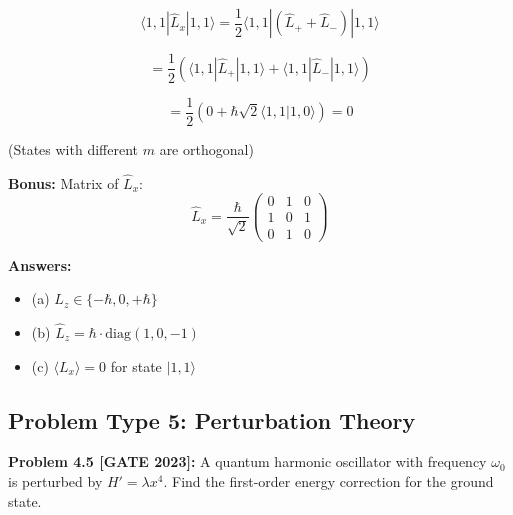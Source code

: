 \documentclass[12pt,a4paper]{article}
\begin{document}
\begin{solution}
$$\langle 1,1|\hat{L}_x|1,1\rangle = \frac{1}{2}\langle 1,1|(\hat{L}_+ + \hat{L}_-)|1,1\rangle$$

$$= \frac{1}{2}\left(\langle 1,1|\hat{L}_+|1,1\rangle + \langle 1,1|\hat{L}_-|1,1\rangle\right)$$

$$= \frac{1}{2}\left(0 + \hbar\sqrt{2}\langle 1,1|1,0\rangle\right) = 0$$

(States with different $m$ are orthogonal)

\textbf{Bonus:} Matrix of $\hat{L}_x$:
$$\hat{L}_x = \frac{\hbar}{\sqrt{2}}\begin{pmatrix}
0 & 1 & 0 \\
1 & 0 & 1 \\
0 & 1 & 0
\end{pmatrix}$$

\textbf{Answers:}
\begin{itemize}
    \item (a) $L_z \in \{-\hbar, 0, +\hbar\}$
    \item (b) $\hat{L}_z = \hbar \cdot \text{diag}(1, 0, -1)$
    \item (c) $\langle L_x \rangle = 0$ for state $|1,1\rangle$
\end{itemize}
\end{solution}

\subsection{Problem Type 5: Perturbation Theory}

\textbf{Problem 4.5 [GATE 2023]:} A quantum harmonic oscillator with frequency $\omega_0$ is perturbed by $H' = \lambda x^4$. Find the first-order energy correction for the ground state.
\end{document}
